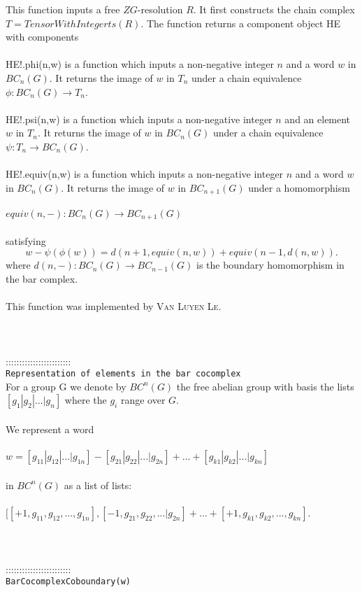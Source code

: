 \documentclass[a4paper,11pt]{report}
\begin{document}
{ This function inputs a free $ZG$-resolution $R$. It first constructs the chain complex $T=TensorWithIntegerts(R)$. The function returns a component object HE with components \\
 \\
 HE!.phi(n,w) is a function which inputs a non-negative integer $n$ and a word $w$ in $BC_n(G)$. It returns the image of $w$ in $T_n$ under a chain equivalence $\phi\colon BC_n(G) \rightarrow T_n$.\\
 \\
 HE!.psi(n,w) is a function which inputs a non-negative integer $n$ and an element $w$ in $T_n$. It returns the image of $w$ in $BC_n(G)$ under a chain equivalence $\psi\colon T_n \rightarrow BC_n(G)$.\\
 \\
 HE!.equiv(n,w) is a function which inputs a non-negative integer $n$ and a word $w$ in $BC_n(G)$. It returns the image of $w$ in $BC_{n+1}(G)$ under a homomorphism \\
 \\
 $equiv(n,-) \colon BC_n(G) \rightarrow BC_{n+1}(G)$ \\
 \\
 satisfying 
\[w - \psi ( \phi (w)) = d(n+1, equiv(n,w)) + equiv(n-1,d(n,w)) . \]
 where $d(n,-)\colon BC_n(G) \rightarrow BC_{n-1}(G)$ is the boundary homomorphism in the bar complex. \\
 \\
 This function was implemented by \textsc{Van Luyen Le}. \\
 \\
 \\
 \\
 ::::::::::::::::::::::::\\
 \texttt{Representation of elements in the bar cocomplex}\\
 

 For a group G we denote by $BC^n(G)$ the free abelian group with basis the lists $[g_1 | g_2 | ... | g_n]$ where the $g_i$ range over $G$. \\
 \\
 We represent a word \\
 \\
 $w = [g_{11} | g_{12} | ... | g_{1n}] - [g_{21} | g_{22} | ... | g_{2n}] + ...
+ [g_{k1} | g_{k2} | ... | g_{kn}] $ \\
 \\
 in $BC^n(G)$ as a list of lists: \\
 \\
 $ [ [+1,g_{11} , g_{12} , ... , g_{1n}] , [-1, g_{21} , g_{22} , ... | g_{2n}] +
... + [+1, g_{k1} , g_{k2} , ... , g_{kn}] $. \\
 \\
 \\
 \\
 ::::::::::::::::::::::::\\
 \texttt{BarCocomplexCoboundary(w)}\\
 

}
\end{document}
